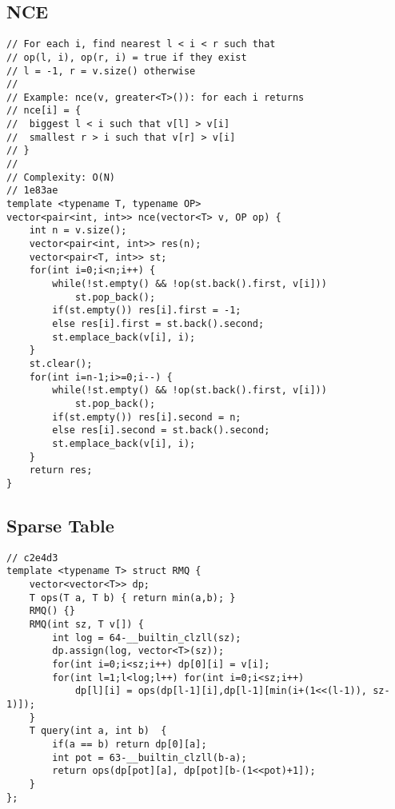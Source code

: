 \documentclass{article}
\begin{document}
\subsection{NCE}
\begin{verbatim}
// For each i, find nearest l < i < r such that 
// op(l, i), op(r, i) = true if they exist
// l = -1, r = v.size() otherwise
//
// Example: nce(v, greater<T>()): for each i returns
// nce[i] = {
//  biggest l < i such that v[l] > v[i]
//  smallest r > i such that v[r] > v[i]
// }
//
// Complexity: O(N)
// 1e83ae
template <typename T, typename OP>
vector<pair<int, int>> nce(vector<T> v, OP op) {
	int n = v.size();
	vector<pair<int, int>> res(n);
	vector<pair<T, int>> st;
	for(int i=0;i<n;i++) {
		while(!st.empty() && !op(st.back().first, v[i])) 
			st.pop_back();
		if(st.empty()) res[i].first = -1;
		else res[i].first = st.back().second;
		st.emplace_back(v[i], i);
	}
	st.clear();
	for(int i=n-1;i>=0;i--) {
		while(!st.empty() && !op(st.back().first, v[i])) 
			st.pop_back();
		if(st.empty()) res[i].second = n;
		else res[i].second = st.back().second;
		st.emplace_back(v[i], i);
	}
	return res;
}
\end{verbatim}
\subsection{Sparse Table}
\begin{verbatim}
// c2e4d3
template <typename T> struct RMQ {
	vector<vector<T>> dp;
	T ops(T a, T b) { return min(a,b); }
	RMQ() {}
	RMQ(int sz, T v[]) {
		int log = 64-__builtin_clzll(sz);
		dp.assign(log, vector<T>(sz));
		for(int i=0;i<sz;i++) dp[0][i] = v[i];
		for(int l=1;l<log;l++) for(int i=0;i<sz;i++) 
			dp[l][i] = ops(dp[l-1][i],dp[l-1][min(i+(1<<(l-1)), sz-1)]);
	}
	T query(int a, int b)  {
		if(a == b) return dp[0][a];
		int pot = 63-__builtin_clzll(b-a);
		return ops(dp[pot][a], dp[pot][b-(1<<pot)+1]);
	}
};
\end{verbatim}
\end{document}
